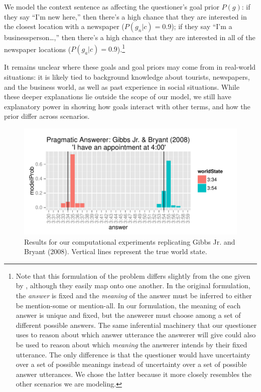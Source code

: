 \documentclass[12pt, floatsintext, jou]{apa6}
\begin{document}
We model the context sentence as affecting the questioner's goal prior $P(g)$: if they say ``I'm new here,'' then there's a high chance that they are interested in the closest location with a newspaper ($P(g_n | c) = 0.9$); if they say ``I'm a businessperson\dots,'' then there's a high chance that they are interested in all of the newspaper locations ($P(g_a | c) = 0.9$).\footnote{Note that this formulation of the problem differs slightly from the one given by , although they easily map onto one another. In the original formulation, the \emph{answer} is fixed and the \emph{meaning} of the answer must be inferred to either be mention-some or mention-all. In our formulation, the meaning of each answer is unique and fixed, but the answerer must choose among a set of different possible answers. The same inferential machinery that our questioner uses to reason about which answer utterance the answerer will give could also be used to reason about which \emph{meaning} the answerer intends by their fixed utterance. The only difference is that the questioner would have uncertainty over a set of possible meanings instead of uncertainty over a set of possible answer utterances. We chose the latter because it more closely resembles the other scenarios we are modeling.}

It remains unclear where these goals and goal priors may come from in real-world situations: it is likely tied to background knowledge about tourists, newspapers, and the business world, as well as past experience in social situations. While these deeper explanations lie outside the scope of our model, we still have explanatory power in showing how goals interact with other terms, and how the prior differ across scenarios. 

 \begin{figure}[t!]
\begin{center}
\includegraphics[scale = 1]{timeExpResults.pdf}
\end{center}
\vspace{-.25cm}
\caption{Results for our computational experiments replicating Gibbs Jr. and Bryant (2008). Vertical lines represent the true world state.}
\label{fig:timeExperimentResults}
\end{figure}
\end{document}
